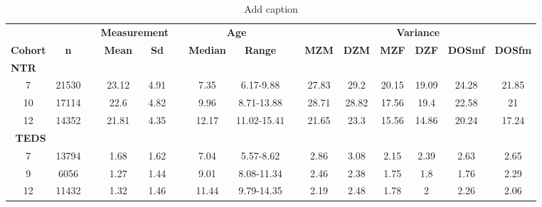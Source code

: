 \begin{table}[htbp]
  \centering
  \caption{Add caption}
    \begin{tabular}{ccrccrccrcccccc}
    \toprule
    \multicolumn{2}{c}{} &       & \multicolumn{2}{c}{\textbf{Measurement}} &       & \multicolumn{2}{c}{\textbf{Age}} &       & \multicolumn{6}{c}{\textbf{Variance}} \\
\cmidrule{4-5}\cmidrule{7-8}\cmidrule{10-15}    \textbf{Cohort} & \textbf{n} &       & \textbf{Mean} & \textbf{Sd} &       & \textbf{Median} & \textbf{Range} &       & \textbf{MZM} & \textbf{DZM} & \textbf{MZF} & \textbf{DZF} & \textbf{DOSmf} & \textbf{DOSfm} \\
    \midrule
    \multicolumn{15}{l}{\textbf{NTR}} \\
    7     & 21530 &       & 23.12 & 4.91  &       & 7.35  & 6.17-9.88 &       & 27.83 & 29.2  & 20.15 & 19.09 & 24.28 & 21.85 \\
    10    & 17114 &       & 22.6  & 4.82  &       & 9.96  & 8.71-13.88 &       & 28.71 & 28.82 & 17.56 & 19.4  & 22.58 & 21 \\
    12    & 14352 &       & 21.81 & 4.35  &       & 12.17 & 11.02-15.41 &       & 21.65 & 23.3  & 15.56 & 14.86 & 20.24 & 17.24 \\
    \multicolumn{1}{r}{\textbf{TEDS}} &       &       &       &       &       &       &       &       &       &       &       &       &       &  \\
    7     & 13794 &       & 1.68  & 1.62  &       & 7.04  & 5.57-8.62 &       & 2.86  & 3.08  & 2.15  & 2.39  & 2.63  & 2.65 \\
    9     & 6056  &       & 1.27  & 1.44  &       & 9.01  & 8.08-11.34 &       & 2.46  & 2.38  & 1.75  & 1.8   & 1.76  & 2.29 \\
    12    & 11432 &       & 1.32  & 1.46  &       & 11.44 & 9.79-14.35 &       & 2.19  & 2.48  & 1.78  & 2     & 2.26  & 2.06 \\
    \bottomrule
    \end{tabular}%
  \label{tab:addlabel}%
\end{table}%

